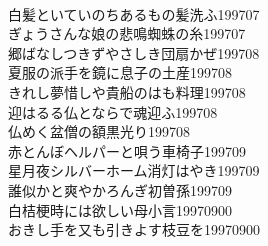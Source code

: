 \begin{multicols}{2}
\\白髪といていのちあるもの髪洗ふ\hfill{199707}
\\ぎょうさんな娘の悲鳴蜘蛛の糸\hfill{199707}
\\郷ばなしつきずやさしき団扇かぜ\hfill{199708}
\\夏服の派手を鏡に息子の土産\hfill{199708}
\\きれし夢惜しや貴船のはも料理\hfill{199708}
\\迎はるる仏とならで魂迎ふ\hfill{199708}
\\仏めく盆僧の額黒光り\hfill{199708}
\\赤とんぼヘルパーと唄う車椅子\hfill{199709}
\\星月夜シルバーホーム消灯はやき\hfill{199709}
\\誰似かと爽やかろんぎ初曽孫\hfill{199709}
\\白桔梗時には欲しい母小言\hfill{19970900}
\\おきし手を又も引きよす枝豆を\hfill{19970900}
\end{multicols}
